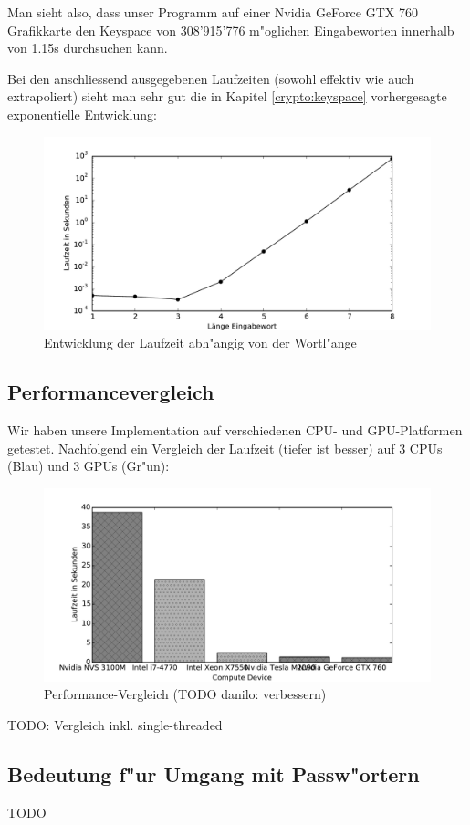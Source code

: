 \begin{refsection}
Man sieht also, dass unser Programm auf einer Nvidia GeForce GTX 760 Grafikkarte
den Keyspace von 308'915'776 m"oglichen Eingabeworten innerhalb von 1.15s
durchsuchen kann.

Bei den anschliessend ausgegebenen Laufzeiten (sowohl effektiv wie auch
extrapoliert) sieht man sehr gut die in Kapitel \ref{crypto:keyspace}
vorhergesagte exponentielle Entwicklung:

\begin{figure}[H]
	\centering
	\includegraphics[width=.9\textwidth]{crypto/graphs/runtime.pdf}
	\caption{Entwicklung der Laufzeit abh"angig von der Wortl"ange}
	\label{img:crypto:triplets}
\end{figure}

\subsection{Performancevergleich}

Wir haben unsere Implementation auf verschiedenen CPU- und GPU-Platformen
getestet. Nachfolgend ein Vergleich der Laufzeit (tiefer ist besser) auf 3 CPUs
(Blau) und 3 GPUs (Gr"un):

\begin{figure}[H]
	\centering
	\includegraphics[width=.9\textwidth]{crypto/graphs/speed_comparison_v1.pdf}
	\caption{Performance-Vergleich (TODO danilo: verbessern)}
	\label{img:crypto:speed_comparison_v1}
\end{figure}

TODO: Vergleich inkl. single-threaded

\subsection{Bedeutung f"ur Umgang mit Passw"ortern}

TODO


\printbibliography[heading=subbibliography]
\end{refsection}
